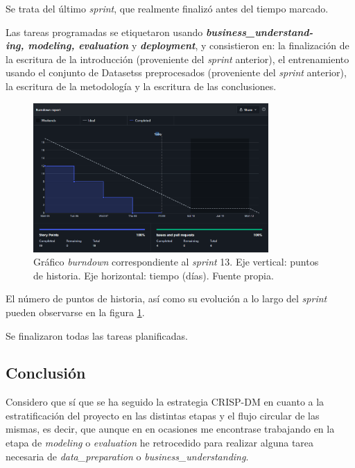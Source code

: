 Se trata del último \textit{sprint}, que realmente finalizó antes del tiempo marcado.

Las tareas programadas se etiquetaron usando \textbf{\textit{business\_understand-\\ing, modeling, evaluation}} y \textbf{\textit{deployment}}, y consistieron en: la finalización de la escritura de la introducción (proveniente del \textit{sprint} anterior), el entrenamiento usando el conjunto de Datasetss preprocesados (proveniente del \textit{sprint} anterior), la escritura de la metodología y la escritura de las conclusiones.

\begin{figure}[h]
    \centering
    \includegraphics[width=0.8\textwidth]{img/bd_5jun.png}
    \caption{Gráfico \textit{burndown} correspondiente al \textit{sprint} 13. Eje vertical: puntos de historia. Eje horizontal: tiempo (días). Fuente propia.}
    \label{fig:bd_13}
\end{figure}

El número de puntos de historia, así como su evolución a lo largo del \textit{sprint} pueden observarse en la figura \ref{fig:bd_13}.

Se finalizaron todas las tareas planificadas.

\subsection{Conclusión}

Considero que sí que se ha seguido la estrategia CRISP-DM en cuanto a la estratificación del proyecto en las distintas etapas y el flujo circular de las mismas, es decir, que aunque en en ocasiones me encontrase trabajando en la etapa de \textit{modeling} o \textit{evaluation} he retrocedido para realizar alguna tarea necesaria de \textit{data\_preparation} o \textit{business\_understanding}.


